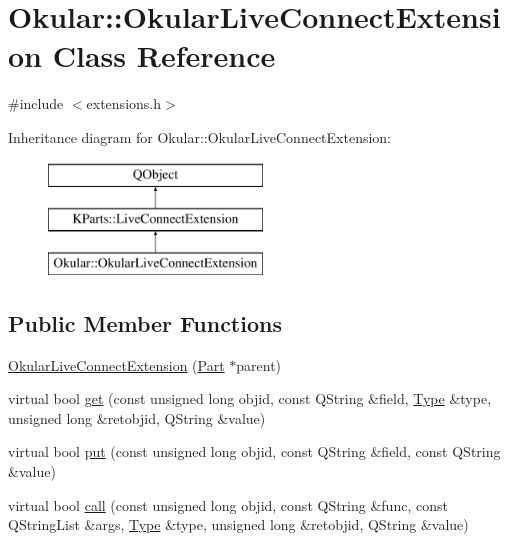\hypertarget{classOkular_1_1OkularLiveConnectExtension}{\section{Okular\+:\+:Okular\+Live\+Connect\+Extension Class Reference}
\label{classOkular_1_1OkularLiveConnectExtension}
}


{\ttfamily \#include $<$extensions.\+h$>$}

Inheritance diagram for Okular\+:\+:Okular\+Live\+Connect\+Extension\+:\begin{figure}[H]
\begin{center}
\leavevmode
\includegraphics[height=3.000000cm]{classOkular_1_1OkularLiveConnectExtension}
\end{center}
\end{figure}
\subsection*{Public Member Functions}
\begin{DoxyCompactItemize}
\item 
\hyperlink{classOkular_1_1OkularLiveConnectExtension_a35e1cb00813ecbbb745db3ab29c73273}{Okular\+Live\+Connect\+Extension} (\hyperlink{classOkular_1_1Part}{Part} $\ast$parent)
\item 
virtual bool \hyperlink{classOkular_1_1OkularLiveConnectExtension_ad0b24f4bdb9c4e2c010a83677ded3f69}{get} (const unsigned long objid, const Q\+String \&field, \hyperlink{classKParts_1_1LiveConnectExtension_a8dfff0d5feb20316c714179c9eda9a9c}{Type} \&type, unsigned long \&retobjid, Q\+String \&value)
\item 
virtual bool \hyperlink{classOkular_1_1OkularLiveConnectExtension_a694218a47c9f7fa0658fea86478b7e12}{put} (const unsigned long objid, const Q\+String \&field, const Q\+String \&value)
\item 
virtual bool \hyperlink{classOkular_1_1OkularLiveConnectExtension_a1db71ccc9e59e46203cd7cd9eccd6870}{call} (const unsigned long objid, const Q\+String \&func, const Q\+String\+List \&args, \hyperlink{classKParts_1_1LiveConnectExtension_a8dfff0d5feb20316c714179c9eda9a9c}{Type} \&type, unsigned long \&retobjid, Q\+String \&value)
\end{DoxyCompactItemize}
